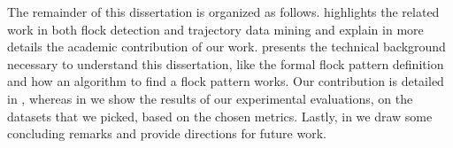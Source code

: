 The remainder of this dissertation is organized as follows.  highlights the related work in
both flock detection and trajectory data mining and explain in more details the academic contribution of our work.
 presents the technical background necessary to understand this dissertation, like the
formal flock pattern definition and how an algorithm to find a flock pattern works. Our contribution is detailed in
, whereas in  we show the results of our experimental evaluations, on the
datasets that we picked, based on the chosen metrics. Lastly, in  we draw some concluding
remarks and provide directions for future work.
